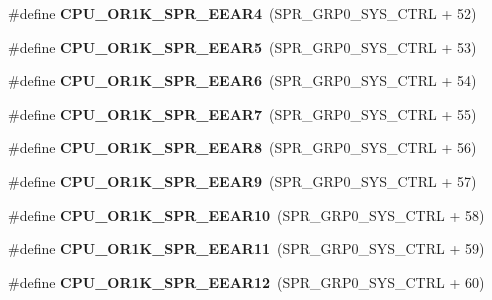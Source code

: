 \begin{DoxyCompactItemize}
\#define {\bfseries C\+P\+U\+\_\+\+O\+R1\+K\+\_\+\+S\+P\+R\+\_\+\+E\+E\+A\+R4}~(S\+P\+R\+\_\+\+G\+R\+P0\+\_\+\+S\+Y\+S\+\_\+\+C\+T\+RL + 52)
\item 
\mbox{\label{or1k-utility_8h_a6def2e7b28c624552abcc8be5f10e93e}} 
\#define {\bfseries C\+P\+U\+\_\+\+O\+R1\+K\+\_\+\+S\+P\+R\+\_\+\+E\+E\+A\+R5}~(S\+P\+R\+\_\+\+G\+R\+P0\+\_\+\+S\+Y\+S\+\_\+\+C\+T\+RL + 53)
\item 
\mbox{\label{or1k-utility_8h_a79dc0af2ded9b219d3958c5970573b2a}} 
\#define {\bfseries C\+P\+U\+\_\+\+O\+R1\+K\+\_\+\+S\+P\+R\+\_\+\+E\+E\+A\+R6}~(S\+P\+R\+\_\+\+G\+R\+P0\+\_\+\+S\+Y\+S\+\_\+\+C\+T\+RL + 54)
\item 
\mbox{\label{or1k-utility_8h_aa2d2d272b993fd09245ae3239ee6f570}} 
\#define {\bfseries C\+P\+U\+\_\+\+O\+R1\+K\+\_\+\+S\+P\+R\+\_\+\+E\+E\+A\+R7}~(S\+P\+R\+\_\+\+G\+R\+P0\+\_\+\+S\+Y\+S\+\_\+\+C\+T\+RL + 55)
\item 
\mbox{\label{or1k-utility_8h_a7c2c688365680e838f36186ee3ff9602}} 
\#define {\bfseries C\+P\+U\+\_\+\+O\+R1\+K\+\_\+\+S\+P\+R\+\_\+\+E\+E\+A\+R8}~(S\+P\+R\+\_\+\+G\+R\+P0\+\_\+\+S\+Y\+S\+\_\+\+C\+T\+RL + 56)
\item 
\mbox{\label{or1k-utility_8h_ab74e9e1015c97730f7e4c0a873a340f1}} 
\#define {\bfseries C\+P\+U\+\_\+\+O\+R1\+K\+\_\+\+S\+P\+R\+\_\+\+E\+E\+A\+R9}~(S\+P\+R\+\_\+\+G\+R\+P0\+\_\+\+S\+Y\+S\+\_\+\+C\+T\+RL + 57)
\item 
\mbox{\label{or1k-utility_8h_ade4e15a6efc368bc7c478b7d288657ba}} 
\#define {\bfseries C\+P\+U\+\_\+\+O\+R1\+K\+\_\+\+S\+P\+R\+\_\+\+E\+E\+A\+R10}~(S\+P\+R\+\_\+\+G\+R\+P0\+\_\+\+S\+Y\+S\+\_\+\+C\+T\+RL + 58)
\item 
\mbox{\label{or1k-utility_8h_af50b470a0d8ec9cdc4a108ae4fe1e05a}} 
\#define {\bfseries C\+P\+U\+\_\+\+O\+R1\+K\+\_\+\+S\+P\+R\+\_\+\+E\+E\+A\+R11}~(S\+P\+R\+\_\+\+G\+R\+P0\+\_\+\+S\+Y\+S\+\_\+\+C\+T\+RL + 59)
\item 
\mbox{\label{or1k-utility_8h_a8f2eadd50543abca62918c3f493cdf92}} 
\#define {\bfseries C\+P\+U\+\_\+\+O\+R1\+K\+\_\+\+S\+P\+R\+\_\+\+E\+E\+A\+R12}~(S\+P\+R\+\_\+\+G\+R\+P0\+\_\+\+S\+Y\+S\+\_\+\+C\+T\+RL + 60)

\end{DoxyCompactItemize}
